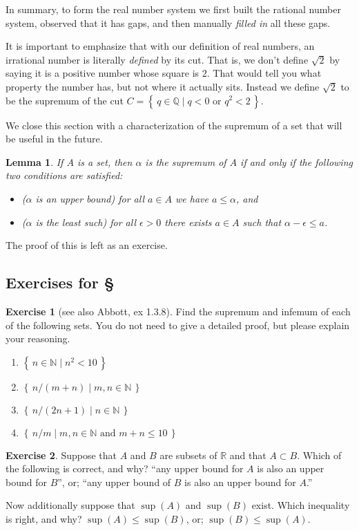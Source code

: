 \documentclass[11pt,oneside]{amsbook}
\newcommand{\set}[1]{\left\{\,#1\,\right\}}
\newcommand{\N}{\mathbb N}
\newcommand{\Q}{\mathbb Q}
\newcommand{\R}{\mathbb R}
\theoremstyle{definition}
\newtheorem{exerc}{Exercise}[section]
\theoremstyle{plain}
\newtheorem{lem}[thm]{Lemma}
\theoremstyle{definition}
\theoremstyle{remark}
\numberwithin{equation}{section}
\numberwithin{figure}{section}
\begin{document}
In summary, to form the real number system we first built the rational number system, observed that it has gaps, and then manually \emph{filled in} all these gaps.

It is important to emphasize that with our definition of real numbers, an irrational number is literally \emph{defined} by its cut. That is, we don't define $\sqrt2$ by saying it is a positive number whose square is $2$. That would tell you what property the number has, but not where it actually sits. Instead we define $\sqrt2$ to be the supremum of the cut $C=\set{q\in\Q\mid q<0\text{ or }q^2<2}$.

We close this section with a characterization of the supremum of a set that will be useful in the future.

\begin{lem}
  If $A$ is a set, then $\alpha$ is the supremum of $A$ if and only if the following two conditions are satisfied:
  \begin{itemize}
  \item ($\alpha$ is an upper bound) for all $a\in A$ we have $a\leq\alpha$, and
  \item ($\alpha$ is the least such) for all $\epsilon>0$ there exists $a\in A$ such that $\alpha-\epsilon\leq a$.
  \end{itemize}
\end{lem}

The proof of this is left as an exercise.

\newpage
\subsection*{Exercises for \S \thesection}

\begin{exerc}[see also Abbott, ex 1.3.8]
  Find the supremum and infemum of each of the following sets. You do not need to give a detailed proof, but please explain your reasoning.
  \begin{enumerate}
  \item $\set{n\in\N\mid n^2<10}$
  \item $\set{n/(m+n)\mid m,n\in\N}$
  \item $\set{n/(2n+1)\mid n\in\N}$
  \item $\set{n/m\mid m,n\in\N\text{ and }m+n\leq10}$
  \end{enumerate}
\end{exerc}

\begin{exerc}
  Suppose that $A$ and $B$ are subsets of $\R$ and that $A\subset B$.  Which of the following is correct, and why? ``any upper bound for $A$ is also an upper bound for $B$'', or; ``any upper bound of $B$ is also an upper bound for $A$.''

  Now additionally suppose that $\sup(A)$ and $\sup(B)$ exist.  Which inequality is right, and why? $\sup(A)\leq\sup(B)$, or; $\sup(B)\leq\sup(A)$.
\end{exerc}
\end{document}
